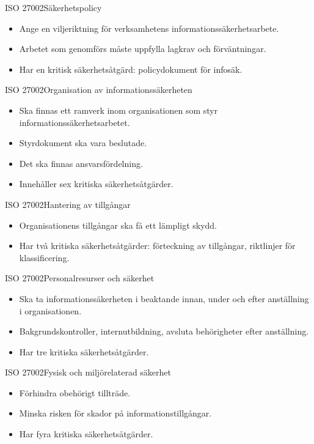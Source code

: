 \documentclass{beamer}
\begin{document}
\begin{frame}{ISO 27002}{Säkerhetspolicy}
  \begin{itemize}
    \item Ange en viljeriktning för verksamhetens informationssäkerhetsarbete.
    \item Arbetet som genomförs måste uppfylla lagkrav och förväntningar.
    \item Har en kritisk säkerhetsåtgärd: policydokument för infosäk.
  \end{itemize}
\end{frame}

\begin{frame}{ISO 27002}{Organisation av informationssäkerheten}
  \begin{itemize}
    \item Ska finnas ett ramverk inom organisationen som styr 
      informationssäkerhetsarbetet.
    \item Styrdokument ska vara beslutade.
    \item Det ska finnas ansvarsfördelning.
    \item Innehåller sex kritiska säkerhetsåtgärder.
  \end{itemize}
\end{frame}

\begin{frame}{ISO 27002}{Hantering av tillgångar}
  \begin{itemize}
    \item Organisationens tillgångar ska få ett lämpligt skydd.
    \item Har två kritiska säkerhetsåtgärder: förteckning av tillgångar, 
      riktlinjer för klassificering.
  \end{itemize}
\end{frame}

\begin{frame}{ISO 27002}{Personalresurser och säkerhet}
  \begin{itemize}
    \item Ska ta informationssäkerheten i beaktande innan, under och efter 
      anställning i organisationen.
    \item Bakgrundskontroller, internutbildning, avsluta behörigheter efter 
      anställning.
    \item Har tre kritiska säkerhetsåtgärder.
  \end{itemize}
\end{frame}

\begin{frame}{ISO 27002}{Fysisk och miljörelaterad säkerhet}
  \begin{itemize}
    \item Förhindra obehörigt tillträde.
    \item Minska risken för skador på informationstillgångar.
    \item Har fyra kritiska säkerhetsåtgärder.
  \end{itemize}
\end{frame}
\end{document}
